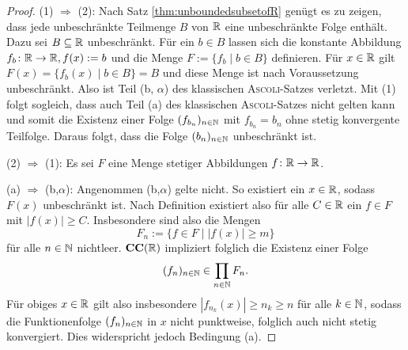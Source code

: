 \begin{proof}
  (1) $\Rightarrow$ (2):
  Nach Satz \ref{thm:unboundedsubsetofR} genügt es zu zeigen, dass jede unbeschränkte Teilmenge $B$ von $\mathbb{R}$ eine unbeschränkte Folge enthält.
  Dazu sei $B \subseteq \mathbb{R}$ unbeschränkt.
  Für ein $b \in B$ lassen sich die konstante Abbildung $f_b \colon \mathbb{R} \to \mathbb{R}, f(x):= b$ und die Menge $F := \{f_b \mid b \in B\}$ definieren.
  Für $x \in \mathbb{R}$ gilt $F(x) = \{f_b(x) \mid b \in B\} = B$ und diese Menge ist nach Voraussetzung unbeschränkt.
  Also ist Teil (b, $\alpha$) des klassischen \textsc{Ascoli}-Satzes verletzt.
  Mit (1) folgt sogleich, dass auch Teil (a) des klassischen \textsc{Ascoli}-Satzes nicht gelten kann und somit die Existenz einer Folge $(f_{b_n})_{n \in \mathbb{N}}$ mit $f_{b_n} = b_n$ ohne stetig konvergente Teilfolge.
  Daraus folgt, dass die Folge $(b_n)_{n \in \mathbb{N}}$ unbeschränkt ist.

  (2) $\Rightarrow$ (1):
  Es sei $F$ eine Menge stetiger Abbildungen $f \colon \mathbb{R} \to \mathbb{R}$.

  (a) $\Rightarrow$ (b,$\alpha$):
  Angenommen (b,$\alpha$) gelte nicht. So existiert ein $x \in \mathbb{R}$, sodass $F(x)$ unbeschränkt ist.
  Nach Definition existiert also für alle $C \in \mathbb{R}$ ein $f \in F$ mit $|f(x)| \geq C$.
  Insbesondere sind also die Mengen 
  \begin{displaymath}
    F_n := \{ f \in F \mid |f(x)| \geq m \}
  \end{displaymath}
  für alle $n \in \mathbb{N}$ nichtleer.
  $\mathbf{CC}(\mathbb{R})$ impliziert folglich die Existenz einer Folge 
  \begin{displaymath}
    (f_n)_{n \in \mathbb{N}} \in \prod_{n \in \mathbb{N}} F_n.
  \end{displaymath}
  Für obiges $x \in \mathbb{R}$ gilt also insbesondere $|f_{n_k}(x)| \geq n_k \geq n$ für alle $k \in \mathbb{N}$, sodass die Funktionenfolge $(f_n)_{n \in \mathbb{N}}$ in $x$ nicht punktweise, folglich auch nicht stetig konvergiert.
  Dies widerspricht jedoch Bedingung (a).


\end{proof}
